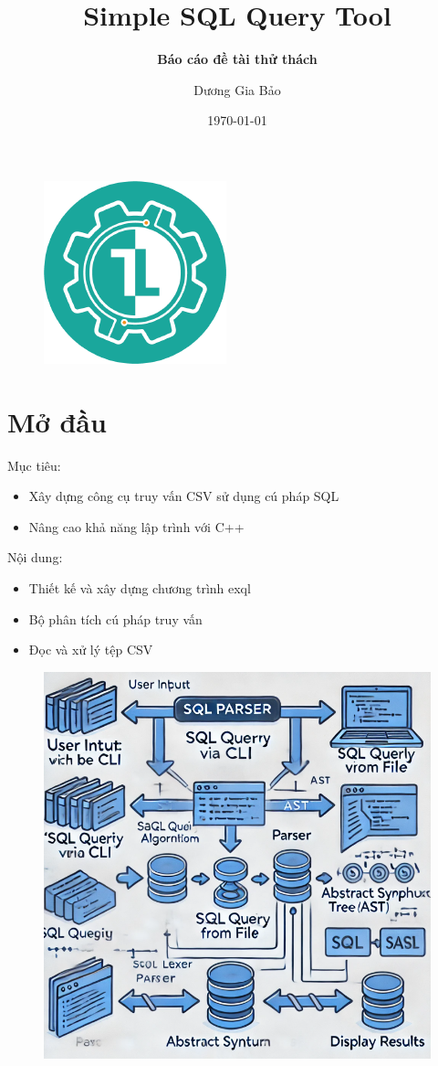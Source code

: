 \documentclass{beamer}
\author{Dương Gia Bảo}
\title{\textbf{Simple SQL Query Tool}}
\subtitle{\textbf{Báo cáo đề tài thử thách}}
\institute{
	TickLab
}
\date{\today}
\begin{document}
	\begin{frame}
		\titlepage
		\begin{figure}[htpb]
			\begin{center}
				\includegraphics[scale=0.2]{ticklablogo.png}
			\end{center}
		\end{figure}
	\end{frame}

	
	\begin{frame}
		\tableofcontents[sectionstyle=show,subsectionstyle=show/shaded/hide,subsubsectionstyle=show/shaded/hide]
	\end{frame}
	
	\section{Mở đầu}
	
	\begin{frame}
		Mục tiêu:
		\begin{itemize}
			\item Xây dựng công cụ truy vấn CSV sử dụng cú pháp SQL
			\item Nâng cao khả năng lập trình với C++
		\end{itemize}
		Nội dung:
		\begin{itemize}
			\item Thiết kế và xây dựng chương trình exql
			\item Bộ phân tích cú pháp truy vấn
			\item Đọc và xử lý tệp CSV
		\end{itemize}
		\begin{figure}
			\centering
			\includegraphics[width=0.4\linewidth]{parser}
			\label{fig:parser}
		\end{figure}
		
	\end{frame}
	
\end{document}
